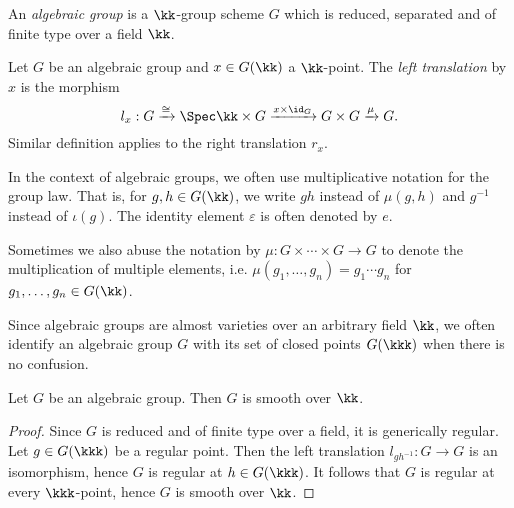     \begin{definition}\label{def:algebraic_group}
        An \emph{algebraic group} is a \(\kk\)-group scheme \(G\) which is reduced, separated and of finite type over a field \(\kk\).
    \end{definition}

    \begin{definition}\label{def:transition_morphism}
        Let \(G\) be an algebraic group and \(x \in G(\kk)\) a \(\kk\)-point.
        The \emph{left translation} by \(x\) is the morphism
        \[
            l_x: G \xrightarrow{\cong} \Spec \kk \times G \xrightarrow{x \times \id_G} G \times G \xrightarrow{\mu} G.
        \]
        Similar definition applies to the right translation \(r_x\).
    \end{definition}

    \begin{remark}\label{rmk:notation_of_multiplication_and_inverse}
        In the context of algebraic groups, we often use multiplicative notation for the group law.
        That is, for \(g,h \in G(\kk)\), we write \(gh\) instead of \(\mu(g,h)\) and \(g^{-1}\) instead of \(\iota(g)\).
        The identity element \(\varepsilon\) is often denoted by \(e\).
        
        Sometimes we also abuse the notation by \(\mu:G \times \cdots \times G \to G\) to denote the multiplication of multiple elements, i.e. \(\mu(g_1,\ldots,g_n) = g_1 \cdots g_n\) for \(g_1,\ldots,g_n \in G(\kk)\).
    \end{remark}

    \begin{remark}\label{rmk:algebraic_group_and_its_closed_points}
        Since algebraic groups are almost varieties over an arbitrary field \(\kk\), we often identify an algebraic group \(G\) with its set of closed points \(G(\kkk)\) when there is no confusion.
    \end{remark}

    \begin{proposition}\label{prop:algebraic_group_is_smooth}
        Let \(G\) be an algebraic group.
        Then \(G\) is smooth over \(\kk\).
    \end{proposition}
    \begin{proof}
        Since \(G\) is reduced and of finite type over a field, it is generically regular.
        Let \(g \in G(\kkk)\) be a regular point.
        Then the left translation \(l_{gh^{-1}}: G \to G\) is an isomorphism, hence \(G\) is regular at \(h \in G(\kkk)\).
        It follows that \(G\) is regular at every \(\kkk\)-point, hence \(G\) is smooth over \(\kk\).
    \end{proof}

